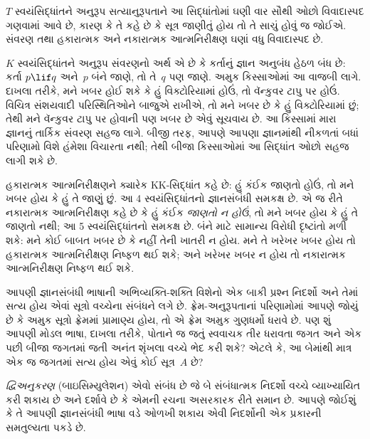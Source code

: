 $T$ સ્વયંસિદ્ધાંતને અનુરૂપ સત્યાનુરૂપતાને આ સિદ્ધાંતોમાં ઘણી વાર
સૌથી ઓછો વિવાદાસ્પદ ગણવામાં આવે છે, કારણ કે તે કહે છે કે
સૂત્ર જાણીતું હોય તો તે સાચું હોવું જ જોઈએ. સંવરણ તથા
હકારાત્મક અને નકારાત્મક આત્મનિરીક્ષણ ઘણાં વધુ વિવાદાસ્પદ છે.

$K$ સ્વયંસિદ્ધાંતને અનુરૂપ સંવરણનો અર્થ એ છે કે કર્તાનું જ્ઞાન
અનુબંધ હેઠળ બંધ છે: કર્તા $p\lif q$ અને~$p$ બંને જાણે, તો
તે~$q$ પણ જાણે. અમુક કિસ્સાઓમાં આ વાજબી લાગે. દાખલા
તરીકે, મને ખબર હોઈ શકે કે હું વિક્ટોરિયામાં હોઉં, તો વૅન્કુવર
ટાપુ પર હોઉં. વિચિત્ર સંશયવાદી પરિસ્થિતિઓને બાજુએ રાખીએ, તો
મને ખબર છે કે હું વિક્ટોરિયામાં છું; તેથી મને વૅન્કુવર ટાપુ
પર હોવાની પણ ખબર છે એવું સૂચવાય છે. આ કિસ્સામાં મારા જ્ઞાનનું
તાર્કિક સંવરણ સહજ લાગે. બીજી તરફ, આપણે આપણા જ્ઞાનમાંથી નીકળતાં
બધાં પરિણામો વિશે હંમેશા વિચારતા નથી; તેથી બીજા કિસ્સાઓમાં
આ સિદ્ધાંત ઓછો સહજ લાગી શકે છે.

હકારાત્મક આત્મનિરીક્ષણને ક્યારેક KK-સિદ્ધાંત કહે છે: હું કંઈક
જાણતો હોઉં, તો મને ખબર હોય કે હું તે જાણું છું. આ 4
સ્વયંસિદ્ધાંતનો જ્ઞાનસંબંધી સમકક્ષ છે. એ જ રીતે નકારાત્મક
આત્મનિરીક્ષણ કહે છે કે હું કંઈક \emph{જાણતો ન હોઉં}, તો મને
ખબર હોય કે હું તે જાણતો નથી; આ 5 સ્વયંસિદ્ધાંતનો સમકક્ષ છે.
બંને માટે સામાન્ય વિરોધી દૃષ્ટાંતો મળી શકે: મને કોઈ બાબત ખબર
છે કે નહીં તેની ખાતરી ન હોય. મને તે ખરેખર ખબર હોય તો હકારાત્મક
આત્મનિરીક્ષણ નિષ્ફળ થઈ શકે; અને ખરેખર ખબર ન હોય તો નકારાત્મક
આત્મનિરીક્ષણ નિષ્ફળ થઈ શકે.
\endgroup

\begingroup
\makeatletter{}\makeatother


\label{guunit:OLP-0488}


આપણી જ્ઞાનસંબંધી ભાષાની અભિવ્યક્તિ-શક્તિ વિશેનો એક બાકી પ્રશ્ન
નિદર્શો અને તેમાં સત્ય હોય એવાં સૂત્રો વચ્ચેના સંબંધને લગે છે.
ફ્રેમ-અનુરૂપતાનાં પરિણામોમાં આપણે જોયું છે કે અમુક સૂત્રો
ફ્રેમમાં પ્રામાણ્ય હોય, તો એ ફ્રેમ અમુક ગુણધર્મો ધરાવે છે.
પણ શું આપણી મોડલ ભાષા, દાખલા તરીકે, પોતાને જ જતું સ્વવાચક તીર
ધરાવતા જગત અને એક પછી બીજા જગતમાં જતી અનંત શૃંખલા વચ્ચે ભેદ
કરી શકે? એટલે કે, આ બેમાંથી માત્ર એક જ જગતમાં સત્ય હોય એવું
કોઈ સૂત્ર~$A$ છે?

\emph{દ્વિઅનુકરણ} (બાઇસિમ્યુલેશન) એવો સંબંધ છે જે બે
સંબંધાત્મક નિદર્શો વચ્ચે વ્યાખ્યાયિત કરી શકાય છે અને દર્શાવે
છે કે એમની રચના અસરકારક રીતે સમાન છે. આપણે જોઈશું કે તે
આપણી જ્ઞાનસંબંધી ભાષા વડે ઓળખી શકાય એવી નિદર્શોની એક પ્રકારની
સમતુલ્યતા પકડે છે.

